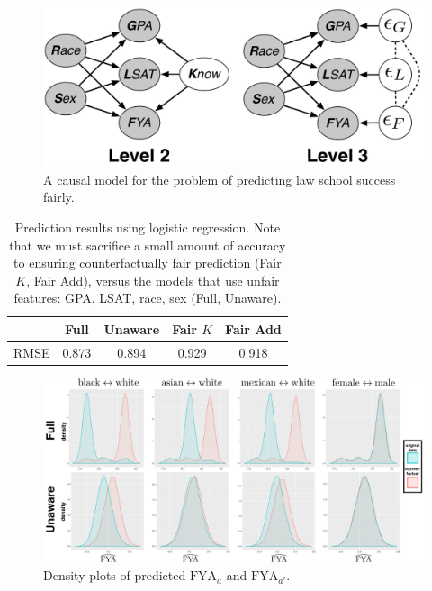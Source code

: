 \begin{figure}[th]
\begin{center}
\vspace{-1ex}
\centerline{\includegraphics[width=0.8\columnwidth]{law_school_model}}
\vspace{-2ex}
\caption{A causal model for the problem of predicting law school success fairly.\label{figure.law_school}\vspace{-2ex}}
\vspace{-2ex}
\end{center}
\end{figure}

\begin{table}
\centering
\caption{Prediction results using logistic regression. Note that we must sacrifice a small amount of accuracy to ensuring counterfactually fair prediction (Fair $K$, Fair Add), versus the models that use unfair features: GPA, LSAT, race, sex (Full, Unaware).}\label{table.pred_law}
\begin{tabular}{ccccc} 
\hline
 &  {\bf Full} & {\bf Unaware} & {\bf Fair $K$} & {\bf Fair Add} \\
\hline
RMSE & 0.873 & 0.894 & 0.929 & 0.918 \\
\hline
\end{tabular}
\end{table}

\begin{figure}[th]
\begin{center}
 \label{figure.counterfactual}
\vspace{-1ex}
\centerline{\includegraphics[width=\columnwidth]{counterfactual}}
\vspace{-2ex}
\caption{Density plots of predicted $\mbox{FYA}_a$ and $\mbox{FYA}_{a'}$.}
\vspace{-2ex}
\end{center}
\end{figure}

